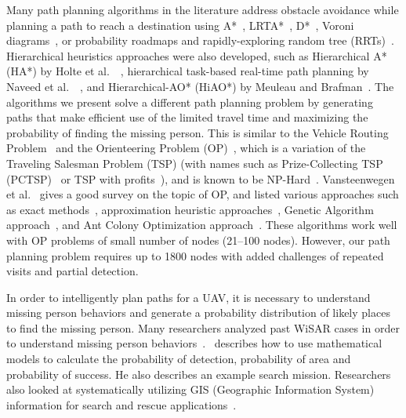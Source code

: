 Many path planning algorithms in the literature address obstacle avoidance while planning a path to reach a destination using A*~\cite{Quigley2005Towards}, LRTA*~\cite{Howlett2006Learning}, D*~\cite{Stentz1997Optimal}, Voroni diagrams~\cite{Bortoff2000Path,Beard2005Autonomous}, or probability roadmaps and rapidly-exploring random tree (RRTs)~\cite{Pettersson2006Probabilistic}. Hierarchical heuristics approaches were also developed, such as Hierarchical A* (HA*) by Holte et al.\ ~\cite{Holte1996Hierarchical}, hierarchical task-based real-time path planning by Naveed et al.\ ~\cite{Meuleau2007Hierarchical}, and Hierarchical-AO* (HiAO*) by Meuleau and Brafman~\cite{Naveed2010Hierarchical}. The algorithms we present solve a different path planning problem by generating paths that make efficient use of the limited travel time and maximizing the probability of finding the missing person. This is similar to the Vehicle Routing Problem~\cite{Laporte1992Vehicle} and the Orienteering Problem (OP)~\cite{Golden1987Orienteering}, which is a variation of the Traveling Salesman Problem (TSP) (with names such as Prize-Collecting TSP (PCTSP)~\cite{Gutin2002Traveling} or TSP with profits~\cite{Feillet2005Traveling}), and is known to be NP-Hard~\cite{Sokkappa1990Cost}. Vansteenwegen et al.\ \cite{Vansteenwegen2011Orienteering} gives a good survey on the topic of OP, and listed various approaches such as exact methods~\cite{Laporte1990Selective,Fischetti1998Solving,Ramesh1992Optimal}, approximation heuristic approaches~\cite{Mittenthal1992Insert,Chao1996Fast,Ramesh1992Optimal}, Genetic Algorithm approach~\cite{Tasgetiren2000Genetic}, and Ant Colony Optimization approach~\cite{Liang2006Ant}. These algorithms work well with OP problems of small number of nodes (21--100 nodes). However, our path planning problem requires up to 1800 nodes with added challenges of repeated visits and partial detection.
 
In order to intelligently plan paths for a UAV, it is necessary to understand missing person behaviors and generate a probability distribution of likely places to find the missing person. Many researchers analyzed past WiSAR cases in order to understand missing person behaviors~\cite{Setnicka1980Wilderness,Hill1998Lost,Syrotuck2000Analysis,Heth1998Characteristics,Koester2008Lost}.~\cite{Syrotuck2000Introduction} describes how to use mathematical models to calculate the probability of detection, probability of area and probability of success. He also describes an example search mission. Researchers also looked at systematically utilizing GIS (Geographic Information System) information for search and rescue applications~\cite{Ferguson2008GIS,Soylemez2006Utility}.

